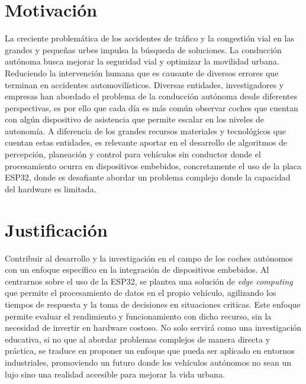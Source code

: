\section{Motivación}
La creciente problemática de los accidentes de tráfico y la congestión vial en las grandes y pequeñas urbes impulsa la búsqueda de soluciones. La conducción autónoma busca mejorar la seguridad vial y optimizar la movilidad urbana. Reduciendo la intervención humana que es causante de diversos errores que terminan en accidentes automovilísticos.
Diversas entidades, investigadores y empresas han abordado el problema de la conducción autónoma desde diferentes perspectivas, es por ello que cada día es más común observar coches que cuentan con algún dispositivo de asistencia que permite escalar en los niveles de autonomía. A diferencia de los grandes recursos materiales y tecnológicos que cuentan estas entidades, es relevante aportar en el desarrollo de algoritmos de percepción, planeación y control para vehículos sin conductor donde el procesamiento ocurra en dispositivos embebidos, concretamente el uso de la placa ESP32, donde  es desafiante abordar un problema complejo donde la capacidad del hardware es limitada.


\section{Justificación}
Contribuir al desarrollo y la investigación en el campo de los coches autónomos con un enfoque específico en la integración de dispositivos embebidos. Al centrarnos sobre el uso de la ESP32, se plantea  una solución de \textit{edge computing} que permite el procesamiento de datos en el propio vehículo, agilizando los tiempos de respuesta y la toma de decisiones en situaciones criticas. Este enfoque permite evaluar el rendimiento y funcionamiento con dicho recurso, sin la necesidad de invertir en hardware costoso. No solo servirá como una investigación educativa, si no que al abordar problemas complejos de manera directa y práctica, se traduce en proponer un enfoque que pueda ser aplicado en entornos industriales, promoviendo un futuro donde los vehículos autónomos no sean un lujo sino una realidad accesible para mejorar la vida urbana.